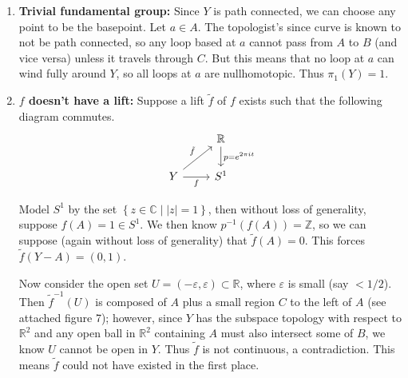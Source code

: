 \documentclass[twoside,10pt]{article}
\begin{document}
\begin{enumerate}
	\item \textbf{Trivial fundamental group:} Since $Y$ is path connected, we can choose any point to be the basepoint. Let $a \in A$. The topologist's since curve is known to not be path connected, so any loop based at $a$ cannot pass from $A$ to $B$ (and vice versa) unless it travels through $C$. But this means that no loop at $a$ can wind fully around $Y$, so all loops at $a$ are nullhomotopic. Thus $\pi_1(Y) = 1$.

	\item \textbf{$f$ doesn't have a lift:} Suppose a lift $\tilde{f}$ of $f$ exists such that the following diagram commutes.
		\[
			\begin{tikzcd}
			& \mathbb{R} \dar{p = e^{2\pi it}} \\
			Y \arrow[ur, "\tilde{f}"] \rar["f"'] & S^{1}
			\end{tikzcd}
		\] 

		Model $S^{1}$ by the set $\left\{ z \in \mathbb{C} \;|\; |z|=1 \right\}$, then without loss of generality, suppose $f(A) = 1 \in S^{1}$. We then know $p^{-1}(f(A)) = \mathbb{Z}$, so we can suppose (again without loss of generality) that $\tilde{f}(A) = 0$. This forces $\tilde{f}(Y-A) = (0,1)$.

		Now consider the open set $U = (-\varepsilon,\varepsilon) \subset \mathbb{R}$, where $\varepsilon$ is small (say $< 1/2$). Then $\tilde{f}^{-1}(U)$ is composed of $A$ plus a small region $C$ to the left of $A$ (see attached figure 7); however, since $Y$ has the subspace topology with respect to $\mathbb{R}^{2}$ and any open ball in $\mathbb{R}^{2}$ containing $A$ must also intersect some of $B$, we know $U$ cannot be open in $Y$. Thus $\tilde{f}$ is not continuous, a contradiction. This means $\tilde{f}$ could not have existed in the first place.
\end{enumerate}

\newpage
\end{document}
